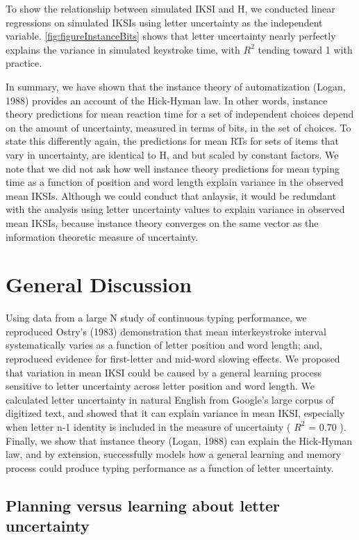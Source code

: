 \documentclass[,man,floatsintext]{apa6}
\begin{document}
To show the relationship between simulated IKSI and H, we conducted linear regressions on simulated IKSIs using letter uncertainty as the independent variable. \ref{fig:figureInstanceBits} shows that letter uncertainty nearly perfectly explains the variance in simulated keystroke time, with \(R^2\) tending toward 1 with practice.

In summary, we have shown that the instance theory of automatization (Logan, 1988) provides an account of the Hick-Hyman law. In other words, instance theory predictions for mean reaction time for a set of independent choices depend on the amount of uncertainty, measured in terms of bits, in the set of choices. To state this differently again, the predictions for mean RTs for sets of items that vary in uncertainty, are identical to H, and but scaled by constant factors. We note that we did not ask how well instance theory predictions for mean typing time as a function of position and word length explain variance in the observed mean IKSIs. Although we could conduct that anlaysis, it would be redundant with the analysis using letter uncertainty values to explain variance in observed mean IKSIs, because instance theory converges on the same vector as the information theoretic measure of uncertainty.

\hypertarget{general-discussion}{%
\section{General Discussion}\label{general-discussion}}

Using data from a large N study of continuous typing performance, we reproduced Ostry's (1983) demonstration that mean interkeystroke interval systematically varies as a function of letter position and word length; and, reproduced evidence for first-letter and mid-word slowing effects. We proposed that variation in mean IKSI could be caused by a general learning process sensitive to letter uncertainty across letter position and word length. We calculated letter uncertainty in natural English from Google's large corpus of digitized text, and showed that it can explain variance in mean IKSI, especially when letter n-1 identity is included in the measure of uncertainty ( \(R^2\) = 0.70 ). Finally, we show that instance theory (Logan, 1988) can explain the Hick-Hyman law, and by extension, successfully models how a general learning and memory process could produce typing performance as a function of letter uncertainty.

\hypertarget{planning-versus-learning-about-letter-uncertainty}{%
\subsection{Planning versus learning about letter uncertainty}\label{planning-versus-learning-about-letter-uncertainty}}
\end{document}
